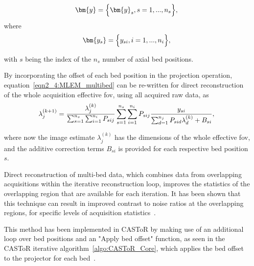 \begin{equation}
   \bm{y} = \Big\{ {\bm{y}_s,s=1,...,n_s} \Big\} \\ , \\
\end{equation}
where
\begin{equation}
   \bm{y_s} = \Big\{ {y_{si},i=1,...,n_i} \Big\} \\ , \\
\end{equation}

with $s$ being the index of the $n_s$ number of axial bed positions.

By incorporating the offset of each bed position in the projection operation, equation~\ref{eqn2_4:MLEM_multibed} can be re-written for direct reconstruction of the whole acquisition effective \gls{fov}, using all acquired raw data, as
\begin{equation}
\lambda_j^{(k+1)} = \frac{\lambda_j^{(k)}}{\sum_{s=1}^{n_s} \sum_{i=1}^{n_i} P_{sij}} 
\sum_{s=1}^{n_s} \sum_{i=1}^{n_i} P_{sij} 
\frac{y_{si}}{\sum_{d=1}^{n_j} P_{sid}\lambda_d^{(k)} + B_{si} } \\ , \\
\label{eqn2_4:MLEM_multibed}
\end{equation} 

where now the image estimate $\lambda_j^{(k)}$ has the dimensions of the whole effective \gls{fov}, and the additive correction terms $B_{si}$ is provided for each respective bed position $s$. 

Direct reconstruction of multi-bed data, which combines data from overlapping acquisitions within the iterative reconstruction loop, improves the statistics of the overlapping region that are available for each iteration. It has been shown that this technique can result in improved contrast to noise ratios at the overlapping regions, for specific levels of acquisition statistics~\cite{Ross2004}. 

This method has been implemented in CASToR by making use of an additional loop over bed positions and an "Apply bed offset" function, as seen in the CASToR iterative algorithm~\ref{algo:CASToR_Core}, which applies the bed offset to the projector for each bed~\cite{Stute2014}. 
